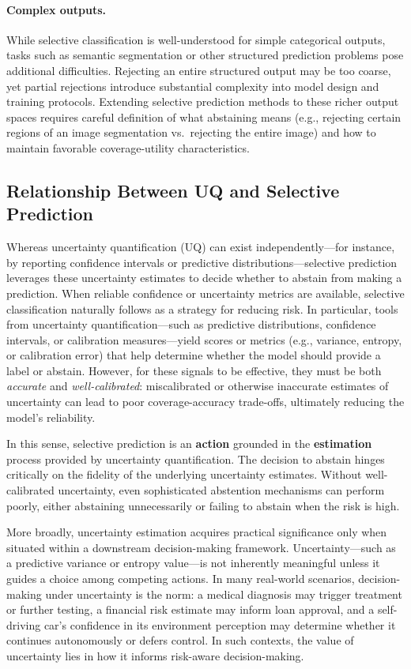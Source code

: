 \paragraph{Complex outputs.}
While selective classification is well-understood for simple categorical outputs, tasks such as semantic segmentation or other structured prediction problems pose additional difficulties. Rejecting an entire structured output may be too coarse, yet partial rejections introduce substantial complexity into model design and training protocols. Extending selective prediction methods to these richer output spaces requires careful definition of what abstaining means (e.g., rejecting certain regions of an image segmentation vs.\ rejecting the entire image) and how to maintain favorable coverage-utility characteristics.


\subsection{Relationship Between UQ and Selective Prediction}

Whereas uncertainty quantification (UQ) can exist independently—for instance, by reporting confidence intervals or predictive distributions—selective prediction leverages these uncertainty estimates to decide whether to abstain from making a prediction. When reliable confidence or uncertainty metrics are available, selective classification naturally follows as a strategy for reducing risk. In particular, tools from uncertainty quantification—such as predictive distributions, confidence intervals, or calibration measures—yield scores or metrics (e.g., variance, entropy, or calibration error) that help determine whether the model should provide a label or abstain. However, for these signals to be effective, they must be both \emph{accurate} and \emph{well-calibrated}: miscalibrated or otherwise inaccurate estimates of uncertainty can lead to poor coverage-accuracy trade-offs, ultimately reducing the model’s reliability.

In this sense, selective prediction is an \textbf{action} grounded in the \textbf{estimation} process provided by uncertainty quantification. The decision to abstain hinges critically on the fidelity of the underlying uncertainty estimates. Without well-calibrated uncertainty, even sophisticated abstention mechanisms can perform poorly, either abstaining unnecessarily or failing to abstain when the risk is high.

More broadly, uncertainty estimation acquires practical significance only when situated within a downstream decision-making framework. Uncertainty—such as a predictive variance or entropy value—is not inherently meaningful unless it guides a choice among competing actions. In many real-world scenarios, decision-making under uncertainty is the norm: a medical diagnosis may trigger treatment or further testing, a financial risk estimate may inform loan approval, and a self-driving car’s confidence in its environment perception may determine whether it continues autonomously or defers control. In such contexts, the value of uncertainty lies in how it informs risk-aware decision-making.

